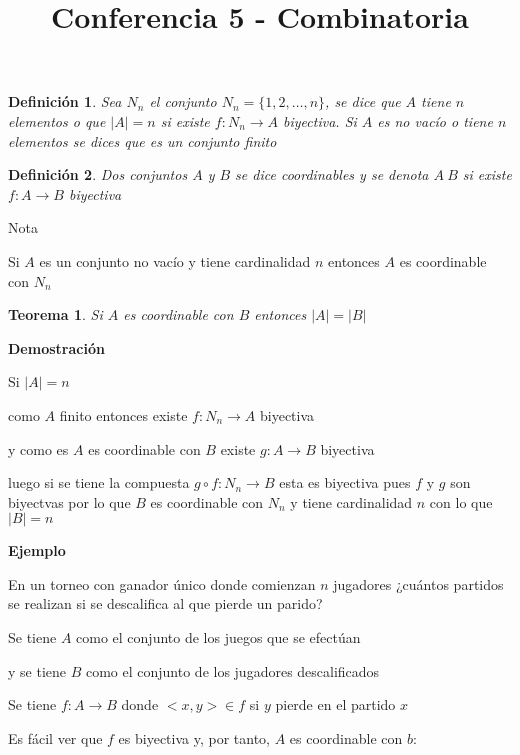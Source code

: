 \documentclass[a4paper,12pt]{report}
\title{Conferencia 5 - Combinatoria}
\author{}
\newtheorem*{teo}{Teorema}
\newtheorem*{dfn}{Definición}
\begin{document}
\maketitle




\begin{dfn}
  Sea $N_n$ el conjunto $N_n=\{1,2,\dots,n\}$, se dice que $A$ tiene $n$ elementos o que $|A|=n$ si existe $f:N_n\rightarrow A$ biyectiva. Si $A$ es no vacío o tiene $n$ elementos se dices que es un conjunto finito
\end{dfn}

\begin{dfn}
 Dos conjuntos $A$ y $B$ se dice coordinables y se denota $A~B$ si existe $f:A\rightarrow B$ biyectiva
\end{dfn}

Nota

Si $A$ es  un conjunto no vacío y tiene cardinalidad $n$ entonces  $A$ es coordinable con $N_n$

\begin{teo}
 Si $A$ es coordinable con $B$ entonces $|A|=|B|$
\end{teo}


\textbf{Demostración}

Si $|A|=n$ 

como $A$ finito entonces existe $f:N_n\rightarrow A$ biyectiva

y como es $A$ es coordinable con $B$ existe $g:A\rightarrow B$ biyectiva

luego si se tiene la compuesta $g\circ f: N_n\rightarrow B$ esta es biyectiva pues $f$ y $g$  son biyectvas por lo que $B$ es coordinable con $N_n$ y tiene cardinalidad $n$ con lo que $|B|=n$

\textbf{Ejemplo}
 
 En un torneo con ganador único donde comienzan $n$ jugadores ¿cuántos partidos se realizan si se descalifica al que pierde un parido?
 
 Se tiene $A$ como el conjunto de los juegos que se efectúan
 
 y se tiene $B$ como el conjunto de los jugadores descalificados
 
 Se tiene  $f:A\rightarrow B$ donde $<x,y>\in f$ si $y$ pierde en el partido $x$
 
 Es fácil ver que $f$ es biyectiva y, por tanto, $A$ es coordinable con $b$:
 
\end{document}

